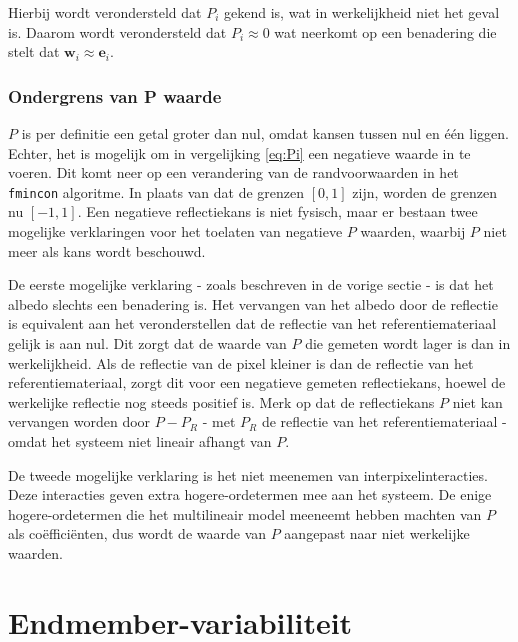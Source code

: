 \documentclass[12pt]{report}
\begin{document}
Hierbij wordt verondersteld dat $P_i$ gekend is, wat in werkelijkheid niet het geval is. Daarom wordt verondersteld dat $P_i \approx 0$ wat neerkomt op een benadering die stelt dat $\bm{w}_i \approx \bm{e}_i$. 

\subsection{Ondergrens van P waarde}

$P$ is per definitie een getal groter dan nul, omdat kansen tussen nul en \'e\'en liggen. Echter, het is mogelijk om in vergelijking \ref{eq:Pi} een negatieve waarde in te voeren. Dit komt neer op een verandering van de randvoorwaarden in het \texttt{fmincon} algoritme. In plaats van dat de grenzen $[0,1]$ zijn, worden de grenzen nu $[-1,1]$. 
Een negatieve reflectiekans is niet fysisch, maar er bestaan twee mogelijke verklaringen voor het toelaten van negatieve $P$ waarden, waarbij $P$ niet meer als kans wordt beschouwd.

De eerste mogelijke verklaring - zoals beschreven in de vorige sectie - is dat het albedo slechts een benadering is. Het vervangen van het albedo door de reflectie is equivalent aan het veronderstellen dat de reflectie van het referentiemateriaal gelijk is aan nul. Dit zorgt dat de waarde van $P$ die gemeten wordt lager is dan in werkelijkheid. Als de reflectie van de pixel kleiner is dan de reflectie van het referentiemateriaal, zorgt dit voor een negatieve gemeten reflectiekans, hoewel de werkelijke reflectie nog steeds positief is. Merk op dat de reflectiekans $P$ niet kan  vervangen worden door $P-P_{R}$  - met $P_{R}$ de reflectie van het referentiemateriaal - omdat het systeem niet lineair afhangt van $P$.

De tweede mogelijke verklaring is het niet meenemen van interpixelinteracties. Deze interacties geven extra hogere-ordetermen mee aan het systeem. De enige hogere-ordetermen die het multilineair model meeneemt hebben machten van $P$ als co\"effici\"enten, dus wordt de waarde van $P$ aangepast naar niet werkelijke waarden.  



\chapter{Endmember-variabiliteit\cite{mesma}} 
\end{document}
